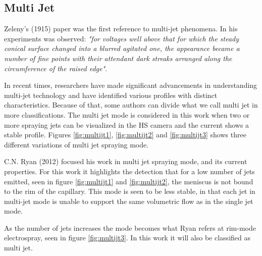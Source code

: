\subsection{Multi Jet}
\label{subsec:Multi Jet}

Zeleny's (1915)\cite{zeleny} paper was the first reference to multi-jet phenomena. In his experiments was observed:
\emph{"for voltages well above that for which the steady conical surface changed into a blurred agitated one, the appearance became a number of fine points with their attendant dark streaks arranged along the circumference of the raised edge".}

In recent times, researchers have made significant advancements in understanding multi-jet technology and have identified various profiles with distinct characteristics. Because of that, some authors can divide what we call multi jet in more classifications.
The multi jet mode is considered in this work when two or more spraying jets can be visualized in the HS camera and the current shows a stable profile. Figures \ref{fig:multijt1}, \ref{fig:multijt2} and \ref{fig:multijt3} shows three different variations of multi jet spraying mode.

C.N. Ryan (2012)\cite{Ryan} focused his work in multi jet spraying mode, and its current properties. 
For this work it highlights the detection that for a low number of jets emitted, seen in figure \ref{fig:multijt1} and \ref{fig:multijt2}, the meniscus is not bound to the rim of the capillary. 
This mode is seen to be less stable, in that each jet in multi-jet mode is unable to support the same volumetric flow as in the single jet mode.

As the number of jets increases the mode becomes what Ryan refers at rim-mode electrospray, seen in figure \ref{fig:multijt3}. In this work it will also be classified as multi jet.



